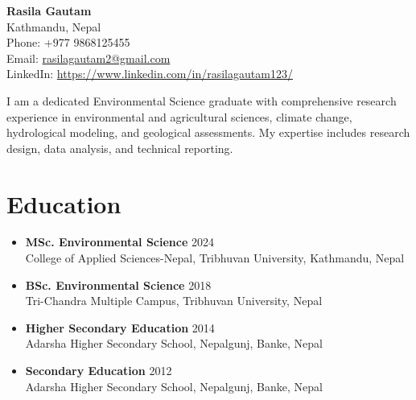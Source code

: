 \documentclass[a4paper,11.5pt]{article}
\begin{document}
\begin{center}
    {\LARGE \textbf{Rasila Gautam}}\\
    Kathmandu, Nepal\\
    Phone: +977 9868125455\\
    Email: \href{mailto:rasilagautam2@gmail.com}{rasilagautam2@gmail.com}\\
    LinkedIn: \url{https://www.linkedin.com/in/rasilagautam123/}
\end{center}

I am a dedicated Environmental Science graduate with comprehensive research experience in environmental and agricultural sciences, climate change, hydrological modeling, and geological assessments. My expertise includes research design, data analysis, and technical reporting.

\section{Education}

\begin{itemize}
    \item \textbf{MSc. Environmental Science} \hspace*{\fill} 2024\\
    College of Applied Sciences-Nepal, Tribhuvan University, Kathmandu, Nepal
    \item \textbf{BSc. Environmental Science} \hspace*{\fill} 2018\\
    Tri-Chandra Multiple Campus, Tribhuvan University, Nepal
    \item \textbf{Higher Secondary Education} \hspace*{\fill} 2014\\
    Adarsha Higher Secondary School, Nepalgunj, Banke, Nepal
    \item \textbf{Secondary Education} \hspace*{\fill} 2012\\
    Adarsha Higher Secondary School, Nepalgunj, Banke, Nepal

\end{itemize}
\end{document}
